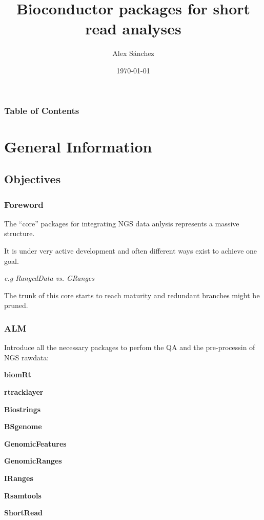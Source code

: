 \documentclass{beamer}
\title{Bioconductor packages for short read analyses}
\author{Alex S\'anchez}
\institute[UEB]{Unitat d'Estadística i Bioinformàtica (UEB)\\
  	}
\date{\today}
\begin{document}


\begin{frame}[plain]
\titlepage
\end{frame}

\begin{frame}[Frame 1]
\addtocounter{framenumber}{-1}
\frametitle{Table of Contents}
\tableofcontents
\end{frame}


\section{General Information}

\subsection{Objectives}

\begin{frame}
\frametitle{Foreword}
  \bit
      \item The ``core'' packages for integrating NGS data anlysis represents a massive structure.
      \item It is under very active development and often different ways exist to achieve one goal.
	      \bit
	          \item \emph{e.g RangedData vs. GRanges}
	      \eit
      \item The trunk of this core starts to reach maturity and redundant branches might be pruned.
  \eit
\end{frame}



\begin{frame}
\frametitle{ALM}
 \bit
      \item Introduce all the necessary packages to perfom the QA and the pre-processin of NGS rawdata:
        \bit
	          \item\textbf{biomRt}
	          \item\textbf{rtracklayer}
	          \item\textbf{Biostrings}
	          \item\textbf{BSgenome}
	          \item\textbf{GenomicFeatures}
	          \item\textbf{GenomicRanges}
	          \item\textbf{IRanges}
	          \item\textbf{Rsamtools}
	          \item\textbf{ShortRead}  
        \eit
 \eit
\end{frame}
\end{document}
